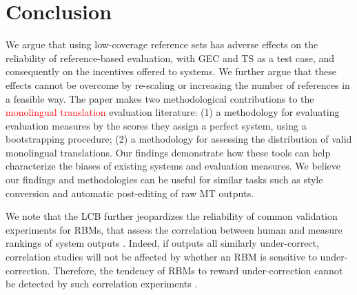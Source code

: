 \documentclass[11pt, a4paper]{article}
\begin{document}
\section{Conclusion}\label{sec:conclusion}



We argue that using low-coverage reference sets has adverse effects on the reliability
of reference-based evaluation, with GEC and TS as a test case, and consequently on the incentives offered to systems.
We further argue that these effects cannot be overcome by re-scaling or increasing the number of references in a feasible way. 
The paper makes two methodological contributions to the \textcolor{red}{monolingual translation} evaluation literature:
(1) a methodology for evaluating evaluation measures by the scores they assign a perfect system, using a bootstrapping procedure;
(2) a methodology for assessing the distribution of valid monolingual translations.
Our findings demonstrate how these tools can help characterize the biases of existing systems and evaluation measures.
We believe our findings and methodologies can be useful for similar tasks such as 
style conversion and automatic post-editing of raw MT outputs.

We note that the LCB further jeopardizes the reliability of common validation experiments for RBMs,
that assess the correlation between human and measure rankings of system outputs \cite{grundkiewicz2015human}.
Indeed, if outputs all similarly under-correct, correlation studies will not be affected by whether an RBM is sensitive to under-correction.
Therefore, the tendency of RBMs to reward under-correction
cannot be detected by such correlation experiments \cite[cf.][]{choshen2018maege}.
\end{document}
